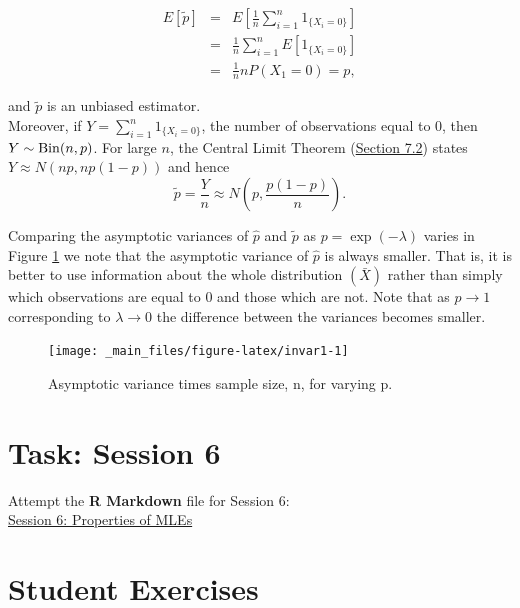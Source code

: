 \documentclass[
]{book}
\begin{document}
\begin{enumerate}
  \begin{eqnarray*} 
  E[ \tilde{p}] &=& E \left[ \frac{1}{n} \sum_{i=1}^n 1_{\{ X_i=0\}} \right] \\ &=& \frac{1}{n} \sum_{i=1}^n E[1_{\{ X_i=0\}}] \\ &=& \frac{1}{n} n P(X_1 =0) = p, 
  \end{eqnarray*}

  and \(\tilde{p}\) is an unbiased estimator.\\
  Moreover, if \(Y = \sum_{i=1}^n 1_{\{ X_i=0\}}\), the number of observations equal to 0, then \(Y \sim {\rm Bin} (n,p)\). For large \(n\), the Central Limit Theorem (\protect\hyperlink{Sec_CLT:statement}{Section 7.2}) states \(Y \approx N (np, np(1-p))\) and hence\\

  \[ \tilde{p} = \frac{Y}{n} \approx N \left( p, \frac{p(1-p)}{n} \right).\]

  Comparing the asymptotic variances of \(\hat{p}\) and \(\tilde{p}\) as \(p = \exp(-\lambda)\) varies in Figure \ref{fig:invar1} we note that the asymptotic variance of \(\hat{p}\) is always smaller. That is, it is better to use information about the whole distribution \((\bar{X})\) rather than simply which observations are equal to 0 and those which are not. Note that as \(p \to 1\) corresponding to \(\lambda \to 0\) the difference between the variances becomes smaller.

  \begin{figure}
  \texttt{[image: \_main\_files/figure-latex/invar1-1]} \caption{Asymptotic variance times sample size, n, for varying p.}\label{fig:invar1}
  \end{figure}
\end{enumerate}

\hfill\break

\hypertarget{MLEprop:lab}{%
\section*{\texorpdfstring{{\textbf{Task: Session 6}}}{Task: Session 6}}\label{MLEprop:lab}}

Attempt the \textbf{R Markdown} file for Session 6:\\
\href{https://moodle.nottingham.ac.uk/course/view.php?id=134982\#section-2}{Session 6: Properties of MLEs}

\hypertarget{MLEprop:exer}{%
\section*{\texorpdfstring{{\textbf{Student Exercises}}}{Student Exercises}}\label{MLEprop:exer}}
\end{document}
